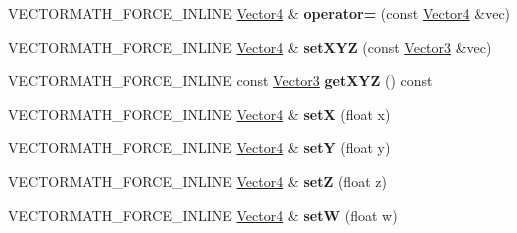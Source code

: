 \begin{DoxyCompactItemize}
V\+E\+C\+T\+O\+R\+M\+A\+T\+H\+\_\+\+F\+O\+R\+C\+E\+\_\+\+I\+N\+L\+I\+NE \hyperlink{classVectormath_1_1Aos_1_1Vector4}{Vector4} \& {\bfseries operator=} (const \hyperlink{classVectormath_1_1Aos_1_1Vector4}{Vector4} \&vec)
\item 
\mbox{\label{classVectormath_1_1Aos_1_1Vector4_a88cc1f151a0de0b632d9eda9f4048403}} 
V\+E\+C\+T\+O\+R\+M\+A\+T\+H\+\_\+\+F\+O\+R\+C\+E\+\_\+\+I\+N\+L\+I\+NE \hyperlink{classVectormath_1_1Aos_1_1Vector4}{Vector4} \& {\bfseries set\+X\+YZ} (const \hyperlink{classVectormath_1_1Aos_1_1Vector3}{Vector3} \&vec)
\item 
\mbox{\label{classVectormath_1_1Aos_1_1Vector4_ad3ecb37c046a5dc79f2638cb94ea734f}} 
V\+E\+C\+T\+O\+R\+M\+A\+T\+H\+\_\+\+F\+O\+R\+C\+E\+\_\+\+I\+N\+L\+I\+NE const \hyperlink{classVectormath_1_1Aos_1_1Vector3}{Vector3} {\bfseries get\+X\+YZ} () const
\item 
\mbox{\label{classVectormath_1_1Aos_1_1Vector4_a3b1066106df5011f068f45f9d81aa78e}} 
V\+E\+C\+T\+O\+R\+M\+A\+T\+H\+\_\+\+F\+O\+R\+C\+E\+\_\+\+I\+N\+L\+I\+NE \hyperlink{classVectormath_1_1Aos_1_1Vector4}{Vector4} \& {\bfseries setX} (float x)
\item 
\mbox{\label{classVectormath_1_1Aos_1_1Vector4_ad0e117a9abe04f1239a61b084c61a731}} 
V\+E\+C\+T\+O\+R\+M\+A\+T\+H\+\_\+\+F\+O\+R\+C\+E\+\_\+\+I\+N\+L\+I\+NE \hyperlink{classVectormath_1_1Aos_1_1Vector4}{Vector4} \& {\bfseries setY} (float y)
\item 
\mbox{\label{classVectormath_1_1Aos_1_1Vector4_ae0240167e06311cc56c68906a2c30f1f}} 
V\+E\+C\+T\+O\+R\+M\+A\+T\+H\+\_\+\+F\+O\+R\+C\+E\+\_\+\+I\+N\+L\+I\+NE \hyperlink{classVectormath_1_1Aos_1_1Vector4}{Vector4} \& {\bfseries setZ} (float z)
\item 
\mbox{\label{classVectormath_1_1Aos_1_1Vector4_af8ab35a1875d77ba0a514dc2c326c925}} 
V\+E\+C\+T\+O\+R\+M\+A\+T\+H\+\_\+\+F\+O\+R\+C\+E\+\_\+\+I\+N\+L\+I\+NE \hyperlink{classVectormath_1_1Aos_1_1Vector4}{Vector4} \& {\bfseries setW} (float w)
\item 
\mbox{\label{classVectormath_1_1Aos_1_1Vector4_a615b2372290227d826ce0c5c94bda324}} 

\end{DoxyCompactItemize}
